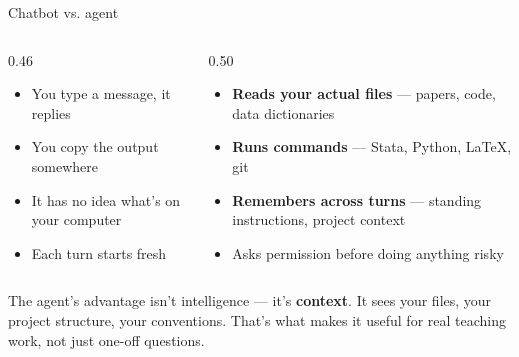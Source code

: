 \documentclass[aspectratio=169, 10pt]{beamer}
\begin{document}
\begin{frame}{Chatbot vs. agent}
\vskip2pt
\begin{columns}[T]
\begin{column}{0.46\textwidth}
\begin{tcolorbox}[dontbox, title={\faComments\quad A chatbot}]
\small
\begin{itemize}\setlength{\itemsep}{2pt}
  \item You type a message, it replies
  \item You copy the output somewhere
  \item It has no idea what's on your computer
  \item Each turn starts fresh
\end{itemize}
\end{tcolorbox}
\end{column}
\begin{column}{0.50\textwidth}
\begin{tcolorbox}[dobox, title={\faRobot\quad An agent}]
\small
\begin{itemize}\setlength{\itemsep}{2pt}
  \item \textbf{Reads your actual files} --- papers, code, data dictionaries
  \item \textbf{Runs commands} --- Stata, Python, LaTeX, git
  \item \textbf{Remembers across turns} --- standing instructions, project context
  \item Asks permission before doing anything risky
\end{itemize}
\end{tcolorbox}
\end{column}
\end{columns}
\vskip4pt
\begin{tcolorbox}[accentbox, top=2pt, bottom=2pt]
\small
The agent's advantage isn't intelligence --- it's \textbf{context}. It sees your files, your project structure, your conventions. That's what makes it useful for real teaching work, not just one-off questions.
\end{tcolorbox}
\end{frame}
\end{document}
